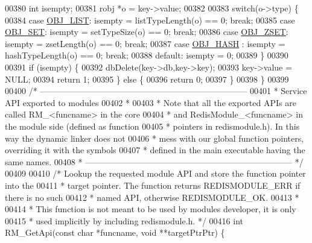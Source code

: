 \begin{DoxyCode}
00380     \textcolor{keywordtype}{int} isempty;
00381     robj *o = key->value;
00382 
00383     \textcolor{keywordflow}{switch}(o->type) \{
00384     \textcolor{keywordflow}{case} \hyperlink{server_8h_a4a5f22a280949c97a0cb0d4213275126}{OBJ\_LIST}: isempty = listTypeLength(o) == 0; \textcolor{keywordflow}{break};
00385     \textcolor{keywordflow}{case} \hyperlink{server_8h_a8d179375a4aac33d3fa7aa80c8ccc75f}{OBJ\_SET}: isempty = setTypeSize(o) == 0; \textcolor{keywordflow}{break};
00386     \textcolor{keywordflow}{case} \hyperlink{server_8h_a8c356422ddbc03bd77694880a30a1953}{OBJ\_ZSET}: isempty = zsetLength(o) == 0; \textcolor{keywordflow}{break};
00387     \textcolor{keywordflow}{case} \hyperlink{server_8h_a87c05ba4f7f36741864277f02a4423fb}{OBJ\_HASH} : isempty = hashTypeLength(o) == 0; \textcolor{keywordflow}{break};
00388     \textcolor{keywordflow}{default}: isempty = 0;
00389     \}
00390 
00391     \textcolor{keywordflow}{if} (isempty) \{
00392         dbDelete(key->db,key->key);
00393         key->value = NULL;
00394         \textcolor{keywordflow}{return} 1;
00395     \} \textcolor{keywordflow}{else} \{
00396         \textcolor{keywordflow}{return} 0;
00397     \}
00398 \}
00399 
00400 \textcolor{comment}{/* --------------------------------------------------------------------------}
00401 \textcolor{comment}{ * Service API exported to modules}
00402 \textcolor{comment}{ *}
00403 \textcolor{comment}{ * Note that all the exported APIs are called RM\_<funcname> in the core}
00404 \textcolor{comment}{ * and RedisModule\_<funcname> in the module side (defined as function}
00405 \textcolor{comment}{ * pointers in redismodule.h). In this way the dynamic linker does not}
00406 \textcolor{comment}{ * mess with our global function pointers, overriding it with the symbols}
00407 \textcolor{comment}{ * defined in the main executable having the same names.}
00408 \textcolor{comment}{ * -------------------------------------------------------------------------- */}
00409 
00410 \textcolor{comment}{/* Lookup the requested module API and store the function pointer into the}
00411 \textcolor{comment}{ * target pointer. The function returns REDISMODULE\_ERR if there is no such}
00412 \textcolor{comment}{ * named API, otherwise REDISMODULE\_OK.}
00413 \textcolor{comment}{ *}
00414 \textcolor{comment}{ * This function is not meant to be used by modules developer, it is only}
00415 \textcolor{comment}{ * used implicitly by including redismodule.h. */}
00416 \textcolor{keywordtype}{int} RM\_GetApi(\textcolor{keyword}{const} \textcolor{keywordtype}{char} *funcname, \textcolor{keywordtype}{void} **targetPtrPtr) \{

\end{DoxyCode}
